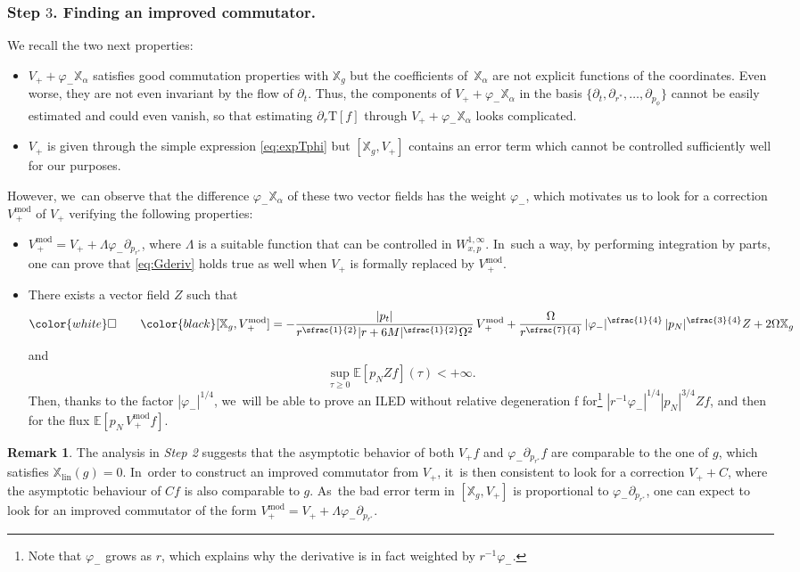 \documentclass[JEP,XML,SOM,Unicode,published]{cedram}
\theoremstyle{plain}
\theoremstyle{definition}
\newtheorem{remark}[proposition]{Remark}
\newcommand\T{{\mathbb{X}}}
\begin{document}
\subsubsection{Step $3$. Finding an improved commutator.} We recall the two next properties:
\begin{itemize}
\item $V_++\varphi_- \T_\alpha$ satisfies good commutation properties with $\T_g$ but the coefficients of~$\T_\alpha$ are not explicit functions of the coordinates. Even worse, they are not even invariant by the flow of $\partial_t$. Thus, the components of $V_++\varphi_- \T_\alpha$ in the basis $\{\partial_t,\partial_{r^*},\dots, \partial_{p_\phi}\}$ cannot be easily estimated and could even vanish, so that estimating $\partial_r\mathrm{T}[f]$ through $V_++\varphi_- \T_\alpha$ looks complicated.
\item $V_+$ is given through the simple expression \eqref{eq:expTphi} but $[\T_g,V_+]$ contains an error term which cannot be controlled sufficiently well for our purposes.
\end{itemize}
However, we~can observe that the difference $\varphi_- \T_\alpha$ of these two vector fields has the weight $\varphi_-$, which motivates us to look for a correction $V_{\, +}^{\mathrm{mod}}$ of $V_+$ verifying the following properties:
\begin{itemize}
\item $V_{\, +}^{\mathrm{mod}} = V_++\Lambda \varphi_- \partial_{p_{r^*}}$, where $\Lambda$ is a suitable function that can be controlled in $W^{1,\infty}_{x,p}$. In~such a way, by performing integration by parts, one can prove that \eqref{eq:Gderiv} holds true as well when $V_+$ is formally replaced by $V_{\, +}^{\mathrm{mod}}$.
\item There exists a vector field $Z$ such that
\[
\color{white} \square \qquad \color{black} [\T_g,V_{\, +}^{\mathrm{mod}}]= - \frac{|p_t|}{r^{\sfrac{1}{2}}|r+6M|^{\sfrac{1}{2}}\Omega^2}\, V_{\, +}^{\mathrm{mod}}+\frac{\Omega}{r^{\sfrac{7}{4}}}\,|\varphi_-|^{\sfrac{1}{4}}\,|p_N|^{\sfrac{3}{4}} Z+2\Omega \T_g
\]
and
\[
\sup_{\tau \geq 0} \mathbb{E}[p_N Zf](\tau) < +\infty.
\]
Then, thanks to the factor $|\varphi_-|^{1/4}$, we~will be able to prove an ILED without relative degeneration \color{white}f\color{black} for\footnote{Note that $\varphi_-$ grows as $r$, which explains why the derivative is in fact weighted by $r^{-1}\varphi_-$.} $|r^{-1}\varphi_-|^{1/4}|p_N|^{3/4} Z f$, and then for the flux $\mathbb{E}[p_N \,V_{\, +}^{\mathrm{mod}} f]$.
\end{itemize}
\begin{remark}
The analysis in \textit{Step 2} suggests that the asymptotic behavior of both $V_+f$ and $\varphi_- \partial_{p_{r^*}}f$ are comparable to the one of $g$, which satisfies $\mathbb{X}_{\mathrm{lin}}(g)=0$. In~order to construct an improved commutator from $V_+$, it~is then consistent to look for a correction $V_++C$, where the asymptotic behaviour of $Cf$ is also comparable to $g$. As~the bad error term in $[\mathbb{X}_g,V_+]$ is proportional to $\varphi_- \partial_{p_{r^*}}$, one can expect to look for an improved commutator of the form $V_+^{\mathrm{mod}}= V_++\Lambda \varphi_- \partial_{p_{r^*}}$.
\end{remark}
\end{document}
